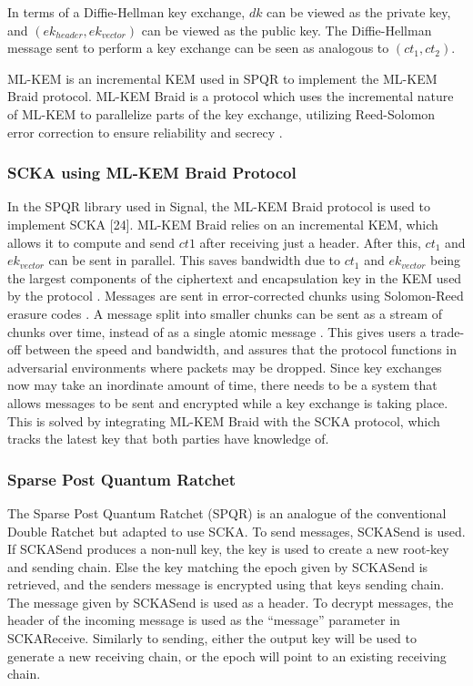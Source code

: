 In terms of a Diffie-Hellman key exchange, $dk$ can be viewed as the private key, and $(ek_{header}, ek_{vector})$ can be viewed as the public key. The Diffie-Hellman message sent to perform a key exchange can be seen as analogous to $(ct_1, ct_2)$.

ML-KEM is an incremental KEM used in SPQR to implement the ML-KEM Braid protocol. ML-KEM Braid is a protocol which uses the incremental nature of ML-KEM to parallelize parts of the key exchange, utilizing Reed-Solomon error correction to ensure reliability and secrecy \cite{ref17} \cite{ref24}.  

\subsubsection{SCKA using ML-KEM Braid Protocol}

In the SPQR library used in Signal, the ML-KEM Braid protocol is used to implement SCKA [24]. ML-KEM Braid relies on an incremental KEM, which allows it to compute and send $ct1$ after receiving just a header. After this, $ct_1$ and $ek_{vector}$ can be sent in parallel. This saves bandwidth due to $ct_1$ and $ek_{vector}$ being the largest components of the ciphertext and encapsulation key in the KEM used by the protocol \cite{ref17}. Messages are sent in error-corrected chunks using Solomon-Reed erasure codes \cite{ref24}. A message split into smaller chunks can be sent as a stream of chunks over time, instead of as a single atomic message \cite{ref17}. This gives users a trade-off between the speed and bandwidth, and assures that the protocol functions in adversarial environments where packets may be dropped. Since key exchanges now may take an inordinate amount of time, there needs to be a system that allows messages to be sent and encrypted while a key exchange is taking place. This is solved by integrating ML-KEM Braid with the SCKA protocol, which tracks the latest key that both parties have knowledge of.

\subsubsection{Sparse Post Quantum Ratchet}

The Sparse Post Quantum Ratchet (SPQR) is an analogue of the conventional Double Ratchet but adapted to use SCKA. To send messages, SCKASend is used. If SCKASend produces a non-null key, the key is used to create a new root-key and sending chain. Else the key matching the epoch given by SCKASend is retrieved, and the senders message is encrypted using that keys sending chain. The message given by SCKASend is used as a header. To decrypt messages, the header of the incoming message is used as the “message” parameter in SCKAReceive. Similarly to sending, either the output key will be used to generate a new receiving chain, or the epoch will point to an existing receiving chain. \cite{ref19}

